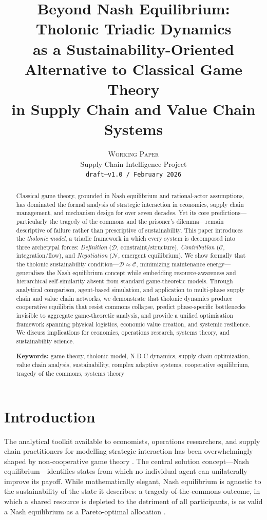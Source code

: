 \documentclass[12pt,a4paper,twocolumn]{article}
\title{%
  \textbf{Beyond Nash Equilibrium: Tholonic Triadic Dynamics\\
  as a Sustainability-Oriented Alternative to Classical Game Theory\\
  in Supply Chain and Value Chain Systems}%
}
\author{%
  \textsc{Working Paper}\\[4pt]
  {\normalsize Supply Chain Intelligence Project}\\
  {\small\texttt{draft---v1.0 / February 2026}}%
}
\date{}
\newcommand{\N}{\mathcal{N}}
\newcommand{\D}{\mathcal{D}}
\newcommand{\CC}{\mathcal{C}}
\begin{document}
\maketitle

\begin{abstract}
\noindent
Classical game theory, grounded in Nash equilibrium and rational-actor assumptions, has dominated the formal analysis of strategic interaction in economics, supply chain management, and mechanism design for over seven decades.
Yet its core predictions---particularly the tragedy of the commons and the prisoner's dilemma---remain descriptive of failure rather than prescriptive of sustainability.
This paper introduces the \emph{tholonic model}, a triadic framework in which every system is decomposed into three archetypal forces: \emph{Definition} ($\D$, constraint/structure), \emph{Contribution} ($\CC$, integration/flow), and \emph{Negotiation} ($\N$, emergent equilibrium).
We show formally that the tholonic sustainability condition---$\D \approx \CC$, minimizing maintenance energy---generalises the Nash equilibrium concept while embedding resource-awareness and hierarchical self-similarity absent from standard game-theoretic models.
Through analytical comparison, agent-based simulation, and application to multi-phase supply chain and value chain networks, we demonstrate that tholonic dynamics produce cooperative equilibria that resist commons collapse, predict phase-specific bottlenecks invisible to aggregate game-theoretic analysis, and provide a unified optimisation framework spanning physical logistics, economic value creation, and systemic resilience.
We discuss implications for economics, operations research, systems theory, and sustainability science.

\medskip
\noindent\textbf{Keywords:} game theory, tholonic model, N-D-C dynamics, supply chain optimization, value chain analysis, sustainability, complex adaptive systems, cooperative equilibrium, tragedy of the commons, systems theory
\end{abstract}

\section{Introduction}
\label{sec:intro}

The analytical toolkit available to economists, operations researchers, and supply chain practitioners for modelling strategic interaction has been overwhelmingly shaped by non-cooperative game theory \citep{vonNeumann1944,Nash1950,Nash1951}.
The central solution concept---Nash equilibrium---identifies states from which no individual agent can unilaterally improve its payoff.
While mathematically elegant, Nash equilibrium is agnostic to the sustainability of the state it describes: a tragedy-of-the-commons outcome, in which a shared resource is depleted to the detriment of all participants, is as valid a Nash equilibrium as a Pareto-optimal allocation \citep{Hardin1968,Ostrom1990}.
\end{document}
